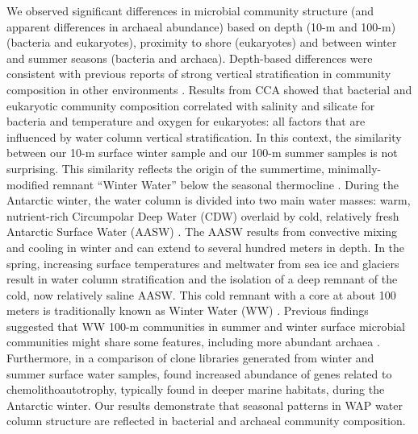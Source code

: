 We observed significant differences in microbial community structure (and apparent differences in archaeal abundance) based on depth (10-m and 100-m) (bacteria and eukaryotes), proximity to shore (eukaryotes) and between winter and summer seasons (bacteria and archaea). Depth-based differences were consistent with previous reports of strong vertical stratification in community composition in other environments \citep{dk05,bpbsblfd09}. Results from CCA showed that bacterial and eukaryotic community composition correlated with salinity and silicate for bacteria and temperature and oxygen for eukaryotes: all factors that are influenced by water column vertical stratification. In this context, the similarity between our 10-m surface winter sample and our 100-m summer samples is not surprising. This similarity reflects the origin of the summertime, minimally-modified remnant ``Winter Water'' below the seasonal thermocline \citep{msisv08,dsvse12}. During the Antarctic winter, the water column is divided into two main water masses: warm, nutrient-rich Circumpolar Deep Water (CDW) overlaid by cold, relatively fresh Antarctic Surface Water (AASW) \citep{cmmkpbs07,msisv08}. The AASW results from convective mixing and cooling in winter and can extend to several hundred meters in depth. In the spring, increasing surface temperatures and meltwater from sea ice and glaciers result in water column stratification and the isolation of a deep remnant of the cold, now relatively saline AASW. This cold remnant with a core at about 100 meters is traditionally known as Winter Water (WW) \citep{m34}. Previous findings suggested that WW 100-m communities in summer and winter surface microbial communities might share some features, including more abundant archaea \citep{mtmwjd98,Church2003-oj}. Furthermore, in a comparison of clone libraries generated from winter and summer surface water samples, \citet{grwddecm12} found increased abundance of genes related to chemolithoautotrophy, typically found in deeper marine habitats, during the Antarctic winter. Our results demonstrate that seasonal patterns in WAP water column structure are reflected in bacterial and archaeal community composition.

